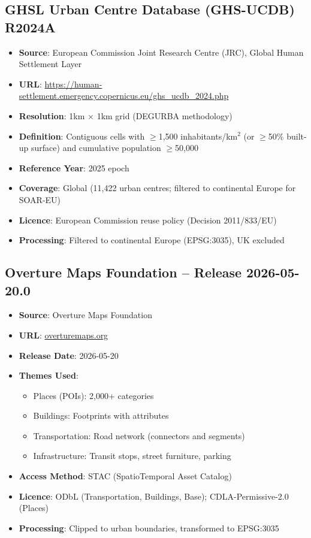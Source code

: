 \subsection{GHSL Urban Centre Database (GHS-UCDB) R2024A}

\begin{itemize}
  \item \textbf{Source}: European Commission Joint Research Centre (JRC), Global Human Settlement Layer
  \item \textbf{URL}: \url{https://human-settlement.emergency.copernicus.eu/ghs_ucdb_2024.php}
  \item \textbf{Resolution}: 1km $\times$ 1km grid (DEGURBA methodology)
  \item \textbf{Definition}: Contiguous cells with $\geq$1,500 inhabitants/km$^2$ (or $\geq$50\% built-up surface) and cumulative population $\geq$50,000
  \item \textbf{Reference Year}: 2025 epoch
  \item \textbf{Coverage}: Global (11,422 urban centres; filtered to continental Europe for SOAR-EU)
  \item \textbf{Licence}: European Commission reuse policy (Decision 2011/833/EU)
  \item \textbf{Processing}: Filtered to continental Europe (EPSG:3035), UK excluded
\end{itemize}

\subsection{Overture Maps Foundation -- Release 2026-05-20.0}

\begin{itemize}
  \item \textbf{Source}: Overture Maps Foundation
  \item \textbf{URL}: \href{https://overturemaps.org/}{overturemaps.org}
  \item \textbf{Release Date}: 2026-05-20
  \item \textbf{Themes Used}:
    \begin{itemize}
      \item Places (POIs): 2,000+ categories
      \item Buildings: Footprints with attributes
      \item Transportation: Road network (connectors and segments)
      \item Infrastructure: Transit stops, street furniture, parking
    \end{itemize}
  \item \textbf{Access Method}: STAC (SpatioTemporal Asset Catalog)
  \item \textbf{Licence}: ODbL (Transportation, Buildings, Base); CDLA-Permissive-2.0 (Places)
  \item \textbf{Processing}: Clipped to urban boundaries, transformed to EPSG:3035
\end{itemize}

